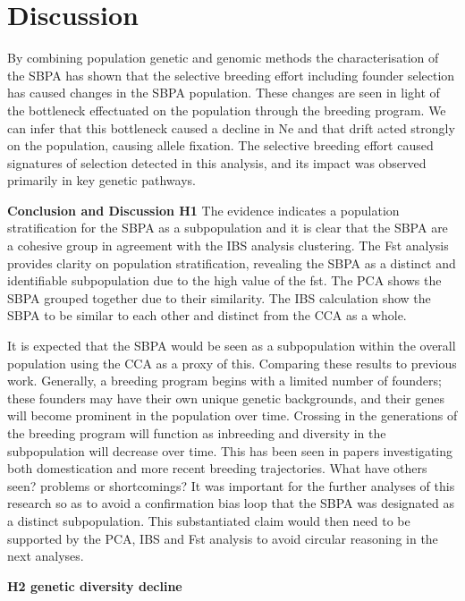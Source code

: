 \documentclass[9pt, twocolumn,twoside]{gsajnl}
\begin{document}
\section{Discussion}

By combining population genetic and genomic methods the characterisation of the SBPA has shown that the selective breeding effort including founder selection has caused changes in the SBPA population. These changes are seen in light of the bottleneck effectuated on the population through the breeding program. We can infer that this bottleneck caused a decline in Ne and that drift acted strongly on the population, causing allele fixation. The selective breeding effort caused signatures of selection detected in this analysis, and its impact was observed primarily in key genetic pathways.

\textbf{Conclusion and Discussion H1} 
The evidence indicates a population stratification for the SBPA as a subpopulation and it is clear that the SBPA are a cohesive group in agreement with the IBS analysis clustering. The Fst analysis provides clarity on population stratification, revealing the SBPA as a distinct and identifiable subpopulation due to the high value of the fst. The PCA shows the SBPA grouped together due to their similarity.  The IBS calculation show the SBPA to be similar to each other and distinct from the CCA as a whole. 

It is expected that the SBPA would be seen as a subpopulation within the overall population using the CCA as a proxy of this. Comparing these results to previous work. Generally, a breeding program begins with a limited number of founders; these founders may have their own unique genetic backgrounds, and their genes will become prominent in the population over time. Crossing in the generations of the breeding program will function as inbreeding and diversity in the subpopulation will decrease over time. This has been seen in papers investigating both domestication and more recent breeding trajectories.  
What have others seen?
problems or shortcomings?
It was important for the further analyses of this research so as to avoid a confirmation bias loop that the SBPA was designated as a distinct subpopulation. This substantiated claim would then need to be supported by the PCA, IBS and Fst analysis to avoid circular reasoning in the next analyses.   
 
\textbf{H2 genetic diversity decline}
\end{document}
